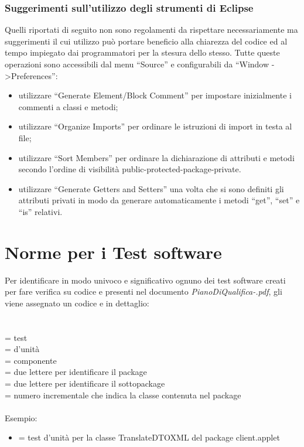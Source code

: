 \subsection{Suggerimenti sull'utilizzo degli strumenti di Eclipse}
Quelli riportati di seguito non sono regolamenti da rispettare necessariamente
ma suggerimenti il cui utilizzo pu\`o portare beneficio alla chiarezza del
codice ed al tempo impiegato dai programmatori per la stesura dello stesso.
Tutte queste operazioni sono accessibili dal menu ``Source'' e configurabili da
``Window -\textgreater Preferences'':
\begin{itemize}
  \item utilizzare ``Generate Element/Block Comment'' per impostare inizialmente
  i commenti a classi e metodi;
  \item utilizzare ``Organize Imports'' per ordinare le istruzioni di import in
  testa al file;
  \item utilizzare ``Sort Members'' per ordinare la dichiarazione di attributi e
  metodi secondo l'ordine di visibilit\`a public-protected-package-private.
  \item utilizzare ``Generate Getters and Setters'' una volta che si sono
  definiti gli attributi privati in modo da generare automaticamente i metodi
  ``get'', ``set'' e ``is'' relativi.
\end{itemize}


\chapter{Norme per i Test software}
\thispagestyle{fancy}
Per identificare in modo univoco e significativo ognuno dei test software creati
per fare verifica su codice e presenti nel documento \emph{PianoDiQualifica-\versionePQ.pdf}, gli viene assegnato un codice e in
dettaglio:\\ \\
 \\
 = test \\
 = d'unit\`a \\
 = componente \\
 = due lettere per identificare il package \\
 = due lettere per identificare il sottopackage \\
 = numero incrementale che indica la classe contenuta nel package
\\ \\
Esempio:
\begin{itemize}
  \item {} = test d'unit\`a per la classe TranslateDTOXML del
  package client.applet
\end{itemize}

